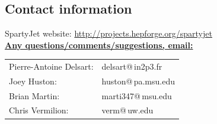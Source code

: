 \documentclass{article}
\newcommand{\prog}[1]{{\sc #1}\xspace}
\newcommand{\SJ}[0]{\prog{SpartyJet}}
\begin{document}
\pagebreak

\section*{}
\subsection*{Contact information}

\SJ website: \url{http://projects.hepforge.org/spartyjet}\\

\underline{\bf Any questions/comments/suggestions, email:}

\begin{tabular}{l l}
Pierre-Antoine Delsart:& delsart@\,in2p3.fr\\
Joey Huston:& huston@\,pa.msu.edu\\
Brian Martin:& marti347@\,msu.edu\\
Chris Vermilion:& verm@\,uw.edu\\
\end{tabular}



\end{document}
